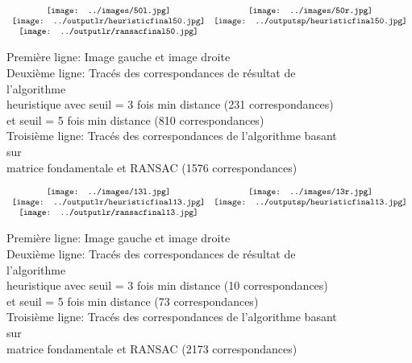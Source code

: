 \documentclass[french,12pt,a4paper,oneside,notitlepage]{report}
\begin{document}
 \begin{figure}[ht]
	\begin{center}$
		\begin{array}[h]{cc}
		  \texttt{[image: ../images/50l.jpg]}&
		  \texttt{[image: ../images/50r.jpg]}\\
		  \texttt{[image: ../outputlr/heuristicfinal50.jpg]}&
		  \texttt{[image: ../outputsp/heuristicfinal50.jpg]}\\
		  \texttt{[image: ../outputlr/ransacfinal50.jpg]}&
		\end{array}$
	\end{center}
	\caption{Première ligne: Image gauche et image droite \\
	\hspace*{1.7cm} Deuxième ligne: Tracés des correspondances de résultat de 
l'algorithme \\
	\hspace*{1.7cm} heuristique avec seuil = 3 fois min distance (231 correspondances)\\
	\hspace*{1.7cm} et seuil = 5 fois min distance (810 correspondances) \\
	\hspace*{1.7cm} Troisième ligne: Tracés des correspondances de l'algorithme basant 
sur \\
	\hspace*{1.7cm} matrice fondamentale et RANSAC (1576 correspondances)} 
\end{figure}
 \begin{figure}[ht]
	\begin{center}$
		\begin{array}[h]{cc}
		  \texttt{[image: ../images/13l.jpg]}&
		  \texttt{[image: ../images/13r.jpg]}\\
		  \texttt{[image: ../outputlr/heuristicfinal13.jpg]}&
		  \texttt{[image: ../outputsp/heuristicfinal13.jpg]}\\
		  \texttt{[image: ../outputlr/ransacfinal13.jpg]}&
		\end{array}$
	\end{center}
	\caption{Première ligne: Image gauche et image droite \\
	\hspace*{1.7cm} Deuxième ligne: Tracés des correspondances de résultat de 
l'algorithme \\
	\hspace*{1.7cm} heuristique avec seuil = 3 fois min distance (10 correspondances)\\
	\hspace*{1.7cm} et seuil = 5 fois min distance (73 correspondances) \\
	\hspace*{1.7cm} Troisième ligne: Tracés des correspondances de l'algorithme basant 
sur \\
	\hspace*{1.7cm} matrice fondamentale et RANSAC (2173 correspondances)} 
\end{figure}
\end{document}
